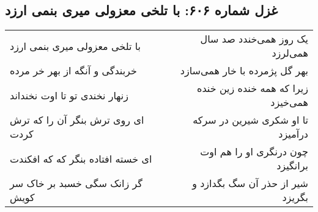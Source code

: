 \begin{center}
\section*{غزل شماره ۶۰۶: با تلخی معزولی میری بنمی ارزد}
\label{sec:0606}
\begin{longtable}{l p{0.5cm} r}
با تلخی معزولی میری بنمی ارزد
&&
یک روز همی‌خندد صد سال همی‌لرزد
\\
خربندگی و آنگه از بهر خر مرده
&&
بهر گل پژمرده با خار همی‌سازد
\\
زنهار نخندی تو تا اوت نخنداند
&&
زیرا که همه خنده زین خنده همی‌خیزد
\\
ای روی ترش بنگر آن را که ترش کردت
&&
تا او شکری شیرین در سرکه درآمیزد
\\
ای خسته افتاده بنگر که که افکندت
&&
چون درنگری او را هم اوت برانگیزد
\\
گر زانک سگی خسبد بر خاک سر کویش
&&
شیر از حذر آن سگ بگدازد و بگریزد
\\
\end{longtable}
\end{center}
